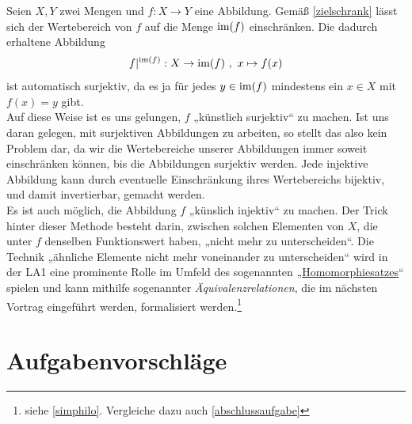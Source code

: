 \begin{bem}
Seien $X,Y$ zwei Mengen und $f:X\to Y$ eine Abbildung. Gemäß \cref{zielschrank} lässt sich der Wertebereich von $f$ auf die Menge $\operatorname{im}(f)$ einschränken. Die dadurch erhaltene Abbildung
\[ f\vert^{\operatorname{im}(f)} : X \to \operatorname{im}(f) \ ,\ x\mapsto f(x) \]
ist automatisch surjektiv, da es ja für jedes $y\in \operatorname{im}(f)$ mindestens ein $x\in X$ mit $f(x)=y$ gibt. \\[0.5em]
Auf diese Weise ist es uns gelungen, $f$ „künstlich surjektiv“ zu machen. Ist uns daran gelegen, mit surjektiven Abbildungen zu arbeiten, so stellt das also kein Problem dar, da wir die Wertebereiche unserer Abbildungen immer soweit einschränken können, bis die Abbildungen surjektiv werden. Jede injektive Abbildung kann durch eventuelle Einschränkung ihres Wertebereichs bijektiv, und damit invertierbar, gemacht werden. \\[0.5em]
Es ist auch möglich, die Abbildung $f$ „künslich injektiv“ zu machen. Der Trick hinter dieser Methode besteht darin, zwischen solchen Elementen von $X$, die unter $f$ denselben Funktionswert haben, „nicht mehr zu unterscheiden“. Die Technik „ähnliche Elemente nicht mehr voneinander zu unterscheiden“ wird in der LA1 eine prominente Rolle im Umfeld des sogenannten „\href{https://de.wikipedia.org/wiki/Homomorphiesatz}{Homomorphiesatzes}“ spielen und kann mithilfe sogenannter \emph{Äquivalenzrelationen}, die im nächsten Vortrag eingeführt werden, formalisiert werden.\footnote{siehe \cref{simphilo}. Vergleiche dazu auch \cref{abschlussaufgabe}}
\end{bem}






\newpage
\section{Aufgabenvorschläge}




